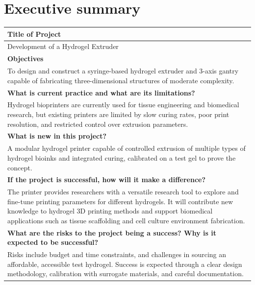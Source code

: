 \chapter*{Executive summary}

\renewcommand{\arraystretch}{1.5}

\begin{longtable}{|m{\textwidth}|}
\hline    

\centering\textbf{\large Title of Project} \\
\hline    
\centering Development of a Hydrogel Extruder \\
\hline    

\centering\textbf{\large Objectives} \\
\hline    
To design and construct a syringe-based hydrogel extruder and 3-axis gantry capable of fabricating three-dimensional structures of moderate complexity. \\
\hline    


\centering\textbf{\large What is current practice and what are its limitations?} \\
\hline    
Hydrogel bioprinters are currently used for tissue engineering and biomedical research, but existing printers are limited by slow curing rates, poor print resolution, and restricted control over extrusion parameters. \\
\hline    

\centering\textbf{\large What is new in this project?} \\
\hline    
A modular hydrogel printer capable of controlled extrusion of multiple types of hydrogel bioinks and integrated curing, calibrated on a test gel to prove the concept. \\
\hline    

\centering\textbf{\large If the project is successful, how will it make a difference?} \\
\hline    
The printer provides researchers with a versatile research tool to explore and fine-tune printing parameters for different hydrogels. It will contribute new knowledge to hydrogel 3D printing methods and support biomedical applications such as tissue scaffolding and cell culture environment fabrication. \\
\hline    

\centering\textbf{\large What are the risks to the project being a success? Why is it expected to be successful?} \\
\hline    
Risks include budget and time constraints, and challenges in sourcing an affordable, accessible test hydrogel. Success is expected through a clear design methodology, calibration with surrogate materials, and careful documentation. \\
\hline    


\end{longtable}
